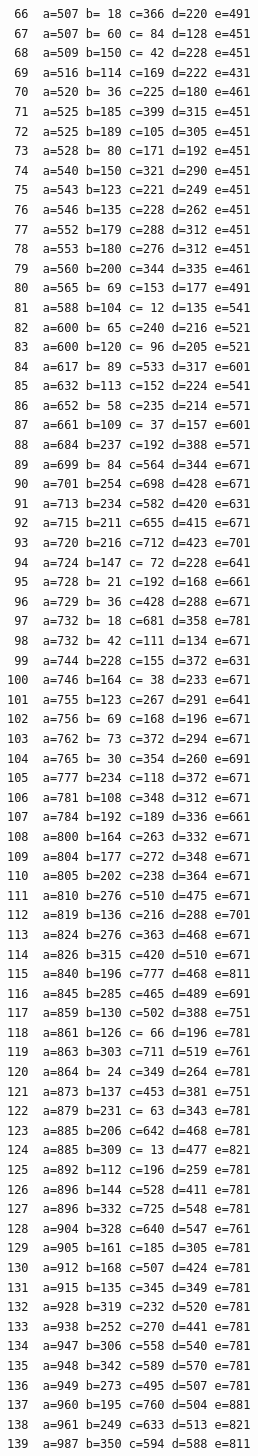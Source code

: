 \documentclass[11pt]{article}
\begin{document}
\begin{lstlisting}
 66  a=507 b= 18 c=366 d=220 e=491
 67  a=507 b= 60 c= 84 d=128 e=451
 68  a=509 b=150 c= 42 d=228 e=451
 69  a=516 b=114 c=169 d=222 e=431
 70  a=520 b= 36 c=225 d=180 e=461
 71  a=525 b=185 c=399 d=315 e=451
 72  a=525 b=189 c=105 d=305 e=451
 73  a=528 b= 80 c=171 d=192 e=451
 74  a=540 b=150 c=321 d=290 e=451
 75  a=543 b=123 c=221 d=249 e=451
 76  a=546 b=135 c=228 d=262 e=451
 77  a=552 b=179 c=288 d=312 e=451
 78  a=553 b=180 c=276 d=312 e=451
 79  a=560 b=200 c=344 d=335 e=461
 80  a=565 b= 69 c=153 d=177 e=491
 81  a=588 b=104 c= 12 d=135 e=541
 82  a=600 b= 65 c=240 d=216 e=521
 83  a=600 b=120 c= 96 d=205 e=521
 84  a=617 b= 89 c=533 d=317 e=601
 85  a=632 b=113 c=152 d=224 e=541
 86  a=652 b= 58 c=235 d=214 e=571
 87  a=661 b=109 c= 37 d=157 e=601
 88  a=684 b=237 c=192 d=388 e=571
 89  a=699 b= 84 c=564 d=344 e=671
 90  a=701 b=254 c=698 d=428 e=671
 91  a=713 b=234 c=582 d=420 e=631
 92  a=715 b=211 c=655 d=415 e=671
 93  a=720 b=216 c=712 d=423 e=701
 94  a=724 b=147 c= 72 d=228 e=641
 95  a=728 b= 21 c=192 d=168 e=661
 96  a=729 b= 36 c=428 d=288 e=671
 97  a=732 b= 18 c=681 d=358 e=781
 98  a=732 b= 42 c=111 d=134 e=671
 99  a=744 b=228 c=155 d=372 e=631
100  a=746 b=164 c= 38 d=233 e=671
101  a=755 b=123 c=267 d=291 e=641
102  a=756 b= 69 c=168 d=196 e=671
103  a=762 b= 73 c=372 d=294 e=671
104  a=765 b= 30 c=354 d=260 e=691
105  a=777 b=234 c=118 d=372 e=671
106  a=781 b=108 c=348 d=312 e=671
107  a=784 b=192 c=189 d=336 e=661
108  a=800 b=164 c=263 d=332 e=671
109  a=804 b=177 c=272 d=348 e=671
110  a=805 b=202 c=238 d=364 e=671
111  a=810 b=276 c=510 d=475 e=671
112  a=819 b=136 c=216 d=288 e=701
113  a=824 b=276 c=363 d=468 e=671
114  a=826 b=315 c=420 d=510 e=671
115  a=840 b=196 c=777 d=468 e=811
116  a=845 b=285 c=465 d=489 e=691
117  a=859 b=130 c=502 d=388 e=751
118  a=861 b=126 c= 66 d=196 e=781
119  a=863 b=303 c=711 d=519 e=761
120  a=864 b= 24 c=349 d=264 e=781
121  a=873 b=137 c=453 d=381 e=751
122  a=879 b=231 c= 63 d=343 e=781
123  a=885 b=206 c=642 d=468 e=781
124  a=885 b=309 c= 13 d=477 e=821
125  a=892 b=112 c=196 d=259 e=781
126  a=896 b=144 c=528 d=411 e=781
127  a=896 b=332 c=725 d=548 e=781
128  a=904 b=328 c=640 d=547 e=761
129  a=905 b=161 c=185 d=305 e=781
130  a=912 b=168 c=507 d=424 e=781
131  a=915 b=135 c=345 d=349 e=781
132  a=928 b=319 c=232 d=520 e=781
133  a=938 b=252 c=270 d=441 e=781
134  a=947 b=306 c=558 d=540 e=781
135  a=948 b=342 c=589 d=570 e=781
136  a=949 b=273 c=495 d=507 e=781
137  a=960 b=195 c=760 d=504 e=881
138  a=961 b=249 c=633 d=513 e=821
139  a=987 b=350 c=594 d=588 e=811
\end{lstlisting}
\end{document}
